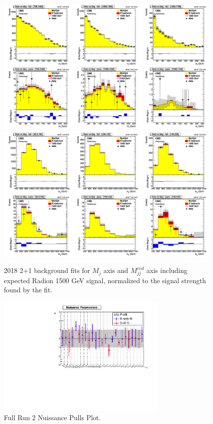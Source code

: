 \begin{figure}[!htb]
	\centering
	\includegraphics[width=1\textwidth]{Figures/postfit_projx_fits_1821.png}
	\includegraphics[width=1\textwidth]{Figures/postfit_projy_fits_1821.png}
	\caption{2018 2$+$1 background fits for $M_j$ axis and $M_{jj}^{red}$ axis including expected Radion 1500 GeV signal, normalized to the signal strength found by the fit.}
	\label{fig:1821}
\end{figure}
\begin{figure}[!htb]
	\centering
	\includegraphics[width=0.75\textwidth]{Figures/nuisance_pulls_byYear.pdf}
	\caption{Full Run 2 Nuissance Pulls Plot.}
	\label{fig:nuissancesAppend}
\end{figure}
